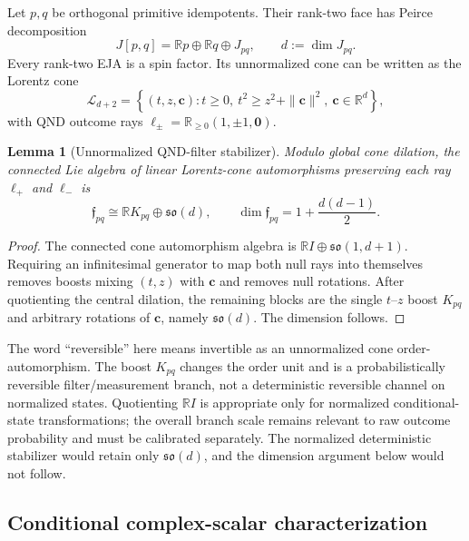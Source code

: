 \documentclass[10pt]{article}
\newtheorem{lemma}[theorem]{Lemma}
\theoremstyle{definition}
\theoremstyle{remark}
\newcommand{\R}{\mathbb R}
\newcommand{\cL}{\mathcal L}
\begin{document}
Let \(p,q\) be orthogonal primitive idempotents. Their rank-two face has Peirce decomposition
\begin{equation}
  J[p,q]=\R p\oplus\R q\oplus J_{pq},
  \qquad d:=\dim J_{pq}.
  \label{eq:peirce-face}
\end{equation}
Every rank-two EJA is a spin factor. Its unnormalized cone can be written as the Lorentz cone
\begin{equation}
  \cL_{d+2}
  =
  \left\{(t,z,\bm c):
  t\ge 0,\ t^2\ge z^2+\|\bm c\|^2,\ \bm c\in\R^d
  \right\},
  \label{eq:lorentz-cone}
\end{equation}
with QND outcome rays
\(\ell_\pm=\R_{\ge0}(1,\pm1,\bm0)\).

\begin{lemma}[Unnormalized QND-filter stabilizer]
\label{lem:qnd-stabilizer}
Modulo global cone dilation, the connected Lie algebra of linear Lorentz-cone automorphisms preserving each ray \(\ell_+\) and \(\ell_-\) is
\begin{equation}
  \mathfrak f_{pq}
  \cong
  \R K_{pq}\oplus\mathfrak{so}(d),
  \qquad
  \dim\mathfrak f_{pq}=1+\frac{d(d-1)}{2}.
  \label{eq:qnd-algebra}
\end{equation}
\end{lemma}

\begin{proof}
The connected cone automorphism algebra is
\(\R I\oplus\mathfrak{so}(1,d+1)\). Requiring an infinitesimal generator to map both null rays into themselves removes boosts mixing \((t,z)\) with \(\bm c\) and removes null rotations. After quotienting the central dilation, the remaining blocks are the single \(t\)--\(z\) boost \(K_{pq}\) and arbitrary rotations of \(\bm c\), namely \(\mathfrak{so}(d)\). The dimension follows.
\end{proof}

The word ``reversible'' here means invertible as an unnormalized cone order-automorphism. The boost \(K_{pq}\) changes the order unit and is a probabilistically reversible filter/measurement branch, not a deterministic reversible channel on normalized states. Quotienting \(\mathbb RI\) is appropriate only for normalized conditional-state transformations; the overall branch scale remains relevant to raw outcome probability and must be calibrated separately. The normalized deterministic stabilizer would retain only \(\mathfrak{so}(d)\), and the dimension argument below would not follow.

\subsection{Conditional complex-scalar characterization}
\end{document}
